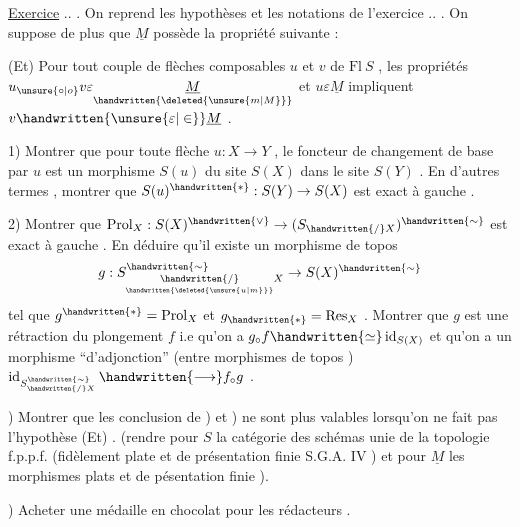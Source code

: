 \uline{Exercice} .. . On reprend les hypothèses et les notations de l'exercice .. . On suppose de plus que \(\underline{M}\) possède la propriété suivante :

(Et) Pour tout couple de flèches composables \(u\) et \(v\) de \(\mathrm{Fl}\ S\) , les  propriétés \(u_{\unsure{\circ|o}}v\varepsilon\underset{\handwritten{\deleted{\unsure{m|M}}}}{\underline{M}}\) et \(u\varepsilon\underline{M}\) impliquent \(v\handwritten{\unsure{\varepsilon|\in}}\underline{M}\) .

1) Montrer que pour toute flèche \(u:X\to Y\) , le foncteur de changement de base par \(u\) est un morphisme  \(S(u)\) du site \(S(X)\) dans le site \(S(Y)\) . En d'autres termes , montrer que \(S(u)^{\handwritten{*}}:S(Y)\to S(X)\) est exact à gauche .

2) Montrer que \(\operatorname{Prol}_X:S(X)^{\handwritten{\vee}}\to(S_{\handwritten{/}X})^{\handwritten{\sim}}\) est exact à gauche . En déduire qu'il existe un morphisme de topos
\[
g:S^{\handwritten{\sim}}_{\underset{\handwritten{\deleted{\unsure{u|m}}}}{\handwritten{/}}X}\to S(X)^{\handwritten{\sim}}
\]
tel que \(g^{\handwritten{*}}=\operatorname{Prol}_X\) et \(g_{\handwritten{*}}=\operatorname{Res}_X\) . Montrer que \(g\) est une rétraction du plongement \(f\) i.e qu'on a \(g_{\circ}f\handwritten{\simeq}\operatorname{id}_{S(X)}\) et qu'on a un morphisme ``d'adjonction'' (entre morphismes de topos ) \(\operatorname{id}_{S^{\handwritten{\sim}}_{\handwritten{/}X}}\handwritten{\longrightarrow} f_{\circ}g\) .

) Montrer que les conclusion de ) et ) ne sont plus valables lorsqu'on ne fait pas l'hypothèse (Et) . (rendre pour \(S\) la catégorie des schémas unie de la topologie f.p.p.f. (fidèlement plate et de présentation finie \handwritten{[} S.G.A.  IV \handwritten{]} ) et pour \(\underline{M}\) les morphismes  plats et de pésentation finie ).

) Acheter une médaille en chocolat pour les rédacteurs .
